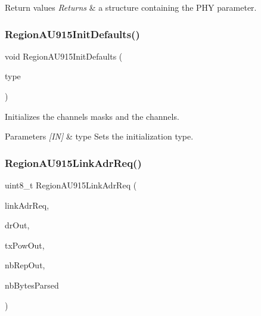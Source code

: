 \begin{DoxyRetVals}{Return values}
{\em Returns} & a structure containing the P\+HY parameter. \\
\hline
\end{DoxyRetVals}
\mbox{\label{group__REGIONAU915_gaf061a05f766feb06e67da3377638034a}} 
\subsubsection{\texorpdfstring{Region\+A\+U915\+Init\+Defaults()}{RegionAU915InitDefaults()}}
{\footnotesize\ttfamily void Region\+A\+U915\+Init\+Defaults (\begin{DoxyParamCaption}\item[{\hyperlink{group__REGION_gaddc73ae10673ec925724e7870363bda9}{Init\+Type\+\_\+t}}]{type }\end{DoxyParamCaption})}



Initializes the channels masks and the channels. 


\begin{DoxyParams}{Parameters}
{\em \mbox{[}\+I\+N\mbox{]}} & type Sets the initialization type. \\
\hline
\end{DoxyParams}
\mbox{\label{group__REGIONAU915_ga2614037d99a37bdd1d3d7df1a3361201}} 
\subsubsection{\texorpdfstring{Region\+A\+U915\+Link\+Adr\+Req()}{RegionAU915LinkAdrReq()}}
{\footnotesize\ttfamily uint8\+\_\+t Region\+A\+U915\+Link\+Adr\+Req (\begin{DoxyParamCaption}\item[{\hyperlink{group__REGION_gad4af503e8d4de1846129e26a799a1e8e}{Link\+Adr\+Req\+Params\+\_\+t} $\ast$}]{link\+Adr\+Req,  }\item[{int8\+\_\+t $\ast$}]{dr\+Out,  }\item[{int8\+\_\+t $\ast$}]{tx\+Pow\+Out,  }\item[{uint8\+\_\+t $\ast$}]{nb\+Rep\+Out,  }\item[{uint8\+\_\+t $\ast$}]{nb\+Bytes\+Parsed }\end{DoxyParamCaption})}



